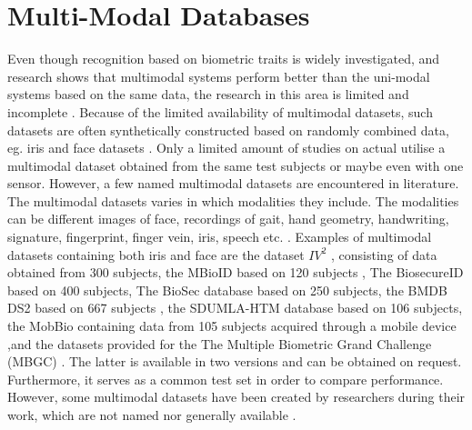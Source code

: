 \section{Multi-Modal Databases}
Even though recognition based on biometric traits is widely investigated, and research shows that multimodal systems perform better than the uni-modal systems based on the same data, the research in this area is limited and incomplete \citep{Chen2005a,Bowyer2016b}. Because of the limited availability of multimodal datasets, such datasets are often synthetically constructed based on randomly combined data, eg. iris and face datasets \citep{Chen2005a}. Only a limited amount of studies on actual utilise a multimodal dataset obtained from the same test subjects or maybe even with one sensor. However, a few named multimodal datasets are encountered in literature. The multimodal datasets varies in which modalities they include. The modalities can be different images of face, recordings of gait, hand geometry, handwriting, signature, fingerprint, finger vein, iris, speech etc. \citep{Yin2011, Dessimoz2007,Ortega-Garcia2010}. Examples of multimodal datasets containing both iris and face are the dataset $IV^2$ \citep{Petrovska-Delacretaz2008a}, consisting of data obtained from 300 subjects, the MBioID based on 120 subjects \citep{Dessimoz2007}, The BiosecureID based on 400 subjects, The BioSec database based on 250 subjects, the BMDB DS2 based on 667 subjects \citep{Ortega-Garcia2010}, the SDUMLA-HTM database based on 106 subjects, the MobBio containing data from 105 subjects acquired through a mobile device \citep{Sequeira2014},and the datasets provided for the The Multiple Biometric Grand Challenge (MBGC) \citep{Bowyer2016b}. The latter is available in two versions and can be obtained on request. Furthermore, it serves as a common test set in order to compare performance. However, some multimodal datasets have been created by researchers during their work, which are not named nor generally available \citep{Bowyer2016b}. 












